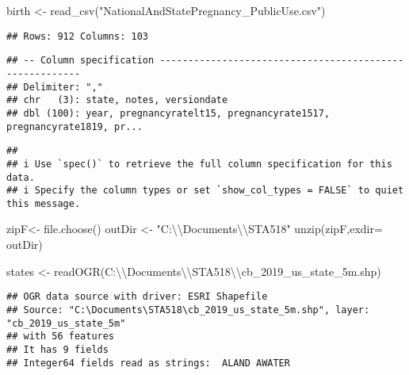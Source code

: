 \documentclass[
]{article}
\newenvironment{Shaded}{\begin{snugshade}}{\end{snugshade}}
\newcommand{\AttributeTok}[1]{\textcolor[rgb]{0.77,0.63,0.00}{#1}}
\newcommand{\FunctionTok}[1]{\textcolor[rgb]{0.00,0.00,0.00}{#1}}
\newcommand{\NormalTok}[1]{#1}
\newcommand{\OtherTok}[1]{\textcolor[rgb]{0.56,0.35,0.01}{#1}}
\newcommand{\SpecialCharTok}[1]{\textcolor[rgb]{0.00,0.00,0.00}{#1}}
\newcommand{\StringTok}[1]{\textcolor[rgb]{0.31,0.60,0.02}{#1}}
\begin{document}
\begin{Shaded}
\begin{Highlighting}[]
\NormalTok{birth }\OtherTok{\textless{}{-}} \FunctionTok{read\_csv}\NormalTok{(}\StringTok{"NationalAndStatePregnancy\_PublicUse.csv"}\NormalTok{)}
\end{Highlighting}
\end{Shaded}

\begin{verbatim}
## Rows: 912 Columns: 103
\end{verbatim}

\begin{verbatim}
## -- Column specification --------------------------------------------------------
## Delimiter: ","
## chr   (3): state, notes, versiondate
## dbl (100): year, pregnancyratelt15, pregnancyrate1517, pregnancyrate1819, pr...
\end{verbatim}

\begin{verbatim}
## 
## i Use `spec()` to retrieve the full column specification for this data.
## i Specify the column types or set `show_col_types = FALSE` to quiet this message.
\end{verbatim}

\begin{Shaded}
\begin{Highlighting}[]
\NormalTok{zipF}\OtherTok{\textless{}{-}} \FunctionTok{file.choose}\NormalTok{()}
\NormalTok{outDir }\OtherTok{\textless{}{-}} \StringTok{"C:}\SpecialCharTok{\textbackslash{}\textbackslash{}}\StringTok{Documents}\SpecialCharTok{\textbackslash{}\textbackslash{}}\StringTok{STA518"}
\FunctionTok{unzip}\NormalTok{(zipF,}\AttributeTok{exdir=}\NormalTok{ outDir)}

\NormalTok{states }\OtherTok{\textless{}{-}} \FunctionTok{readOGR}\NormalTok{(}\StringTok{\textquotesingle{}C:}\SpecialCharTok{\textbackslash{}\textbackslash{}}\StringTok{Documents}\SpecialCharTok{\textbackslash{}\textbackslash{}}\StringTok{STA518}\SpecialCharTok{\textbackslash{}\textbackslash{}}\StringTok{cb\_2019\_us\_state\_5m.shp\textquotesingle{}}\NormalTok{)}
\end{Highlighting}
\end{Shaded}

\begin{verbatim}
## OGR data source with driver: ESRI Shapefile 
## Source: "C:\Documents\STA518\cb_2019_us_state_5m.shp", layer: "cb_2019_us_state_5m"
## with 56 features
## It has 9 fields
## Integer64 fields read as strings:  ALAND AWATER
\end{verbatim}
\end{document}
